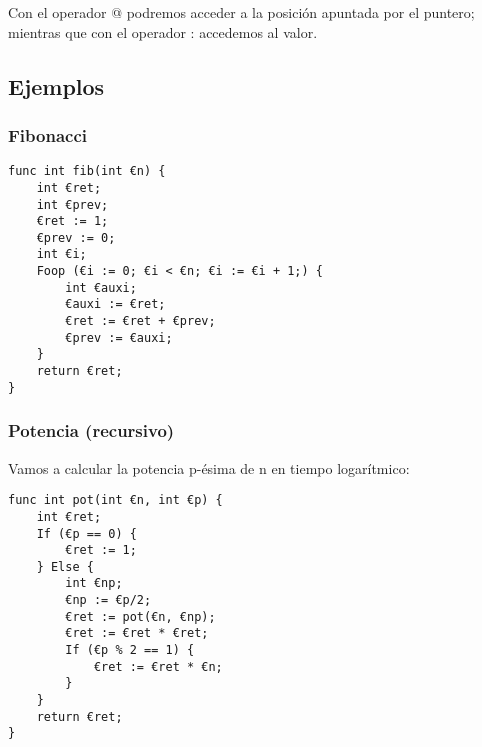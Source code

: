 \documentclass[spanish, a4paper, 12pt] {article}
\begin{document}
Con el operador @ podremos acceder a la posición apuntada por el puntero; mientras que con el operador : accedemos al valor.

\subsection*{Ejemplos}
\subsubsection*{Fibonacci}
\begin{verbatim}
func int fib(int €n) {
    int €ret;
    int €prev;
    €ret := 1;
    €prev := 0;
    int €i;
    Foop (€i := 0; €i < €n; €i := €i + 1;) {
        int €auxi;
        €auxi := €ret;
        €ret := €ret + €prev;
        €prev := €auxi;
    }
    return €ret;
}
\end{verbatim}
\subsubsection*{Potencia (recursivo)}
Vamos a calcular la potencia p-ésima de n en tiempo logarítmico:
\begin{verbatim}
func int pot(int €n, int €p) {
    int €ret;
    If (€p == 0) {
        €ret := 1;
    } Else {
        int €np;
        €np := €p/2;
        €ret := pot(€n, €np);
        €ret := €ret * €ret;
        If (€p % 2 == 1) {
            €ret := €ret * €n;
        }
    }
    return €ret;
}
\end{verbatim}
\end{document}
